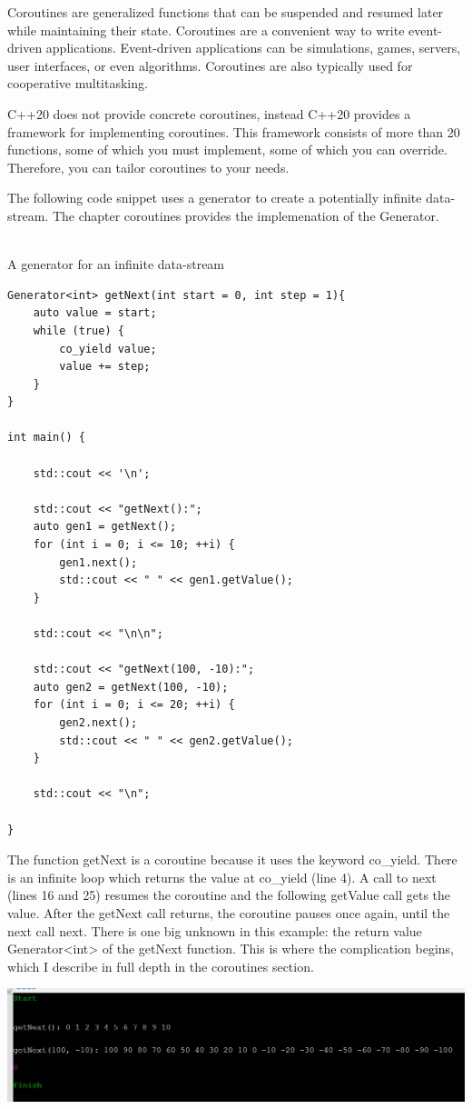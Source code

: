 
Coroutines are generalized functions that can be suspended and resumed later while maintaining their state. Coroutines are a convenient way to write event-driven applications. Event-driven applications can be simulations, games, servers, user interfaces, or even algorithms. Coroutines are also typically used for cooperative multitasking.

C++20 does not provide concrete coroutines, instead C++20 provides a framework for implementing coroutines. This framework consists of more than 20 functions, some of which you must implement, some of which you can override. Therefore, you can tailor coroutines to your needs.

The following code snippet uses a generator to create a potentially infinite data-stream. The chapter coroutines provides the implemenation of the Generator.

\hspace*{\fill} \\ %
\noindent
A generator for an infinite data-stream
\begin{lstlisting}[style=styleCXX]
Generator<int> getNext(int start = 0, int step = 1){
	auto value = start;
	while (true) {
		co_yield value;
		value += step;
	}
}

int main() {
	
	std::cout << '\n';
	
	std::cout << "getNext():";
	auto gen1 = getNext();
	for (int i = 0; i <= 10; ++i) {
		gen1.next();
		std::cout << " " << gen1.getValue();
	}
	
	std::cout << "\n\n";
	
	std::cout << "getNext(100, -10):";
	auto gen2 = getNext(100, -10);
	for (int i = 0; i <= 20; ++i) {
		gen2.next();
		std::cout << " " << gen2.getValue();
	}
	
	std::cout << "\n";

}
\end{lstlisting}

The function getNext is a coroutine because it uses the keyword co\_yield. There is an infinite loop which returns the value at co\_yield (line 4). A call to next (lines 16 and 25) resumes the coroutine and the following getValue call gets the value. After the getNext call returns, the coroutine pauses once again, until the next call next. There is one big unknown in this example: the return value Generator<int> of the getNext function. This is where the complication begins, which I describe in full depth in the coroutines section.

\begin{center}
\includegraphics[width=1.0\textwidth]{content/2/chapter3/images/3.png}\\
\end{center}















